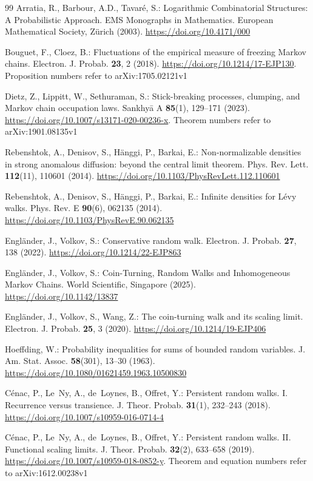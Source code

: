 \documentclass[11pt]{article}
\theoremstyle{definition}
\theoremstyle{remark}
\begin{document}
\begin{thebibliography}{99}
Arratia, R., Barbour, A.D., Tavar\'e, S.: Logarithmic Combinatorial
Structures: A Probabilistic Approach. EMS Monographs in Mathematics. European
Mathematical Society, Z\"urich (2003). \url{https://doi.org/10.4171/000}

Bouguet, F., Cloez, B.: Fluctuations of the empirical measure of freezing
Markov chains. Electron. J. Probab. \textbf{23}, 2 (2018).
\url{https://doi.org/10.1214/17-EJP130}. Proposition numbers refer to
arXiv:1705.02121v1

Dietz, Z., Lippitt, W., Sethuraman, S.: Stick-breaking processes, clumping,
and Markov chain occupation laws. Sankhy\=a A \textbf{85}(1), 129--171
(2023). \url{https://doi.org/10.1007/s13171-020-00236-x}. Theorem numbers
refer to arXiv:1901.08135v1

Rebenshtok, A., Denisov, S., H\"anggi, P., Barkai, E.: Non-normalizable
densities in strong anomalous diffusion: beyond the central limit theorem.
Phys. Rev. Lett. \textbf{112}(11), 110601 (2014).
\url{https://doi.org/10.1103/PhysRevLett.112.110601}

Rebenshtok, A., Denisov, S., H\"anggi, P., Barkai, E.: Infinite densities for
L\'evy walks. Phys. Rev. E \textbf{90}(6), 062135 (2014).
\url{https://doi.org/10.1103/PhysRevE.90.062135}

Engl\"ander, J., Volkov, S.: Conservative random walk. Electron. J. Probab.
\textbf{27}, 138 (2022). \url{https://doi.org/10.1214/22-EJP863}

Engl\"ander, J., Volkov, S.: Coin-Turning, Random Walks and Inhomogeneous
Markov Chains. World Scientific, Singapore (2025).
\url{https://doi.org/10.1142/13837}

Engl\"ander, J., Volkov, S., Wang, Z.: The coin-turning walk and its scaling
limit. Electron. J. Probab. \textbf{25}, 3 (2020).
\url{https://doi.org/10.1214/19-EJP406}

Hoeffding, W.: Probability inequalities for sums of bounded random variables.
J. Am. Stat. Assoc. \textbf{58}(301), 13--30 (1963).
\url{https://doi.org/10.1080/01621459.1963.10500830}

C\'enac, P., Le~Ny, A., de~Loynes, B., Offret, Y.: Persistent random walks.
I. Recurrence versus transience. J. Theor. Probab. \textbf{31}(1), 232--243
(2018). \url{https://doi.org/10.1007/s10959-016-0714-4}

C\'enac, P., Le~Ny, A., de~Loynes, B., Offret, Y.: Persistent random walks.
II. Functional scaling limits. J. Theor. Probab. \textbf{32}(2), 633--658
(2019). \url{https://doi.org/10.1007/s10959-018-0852-y}. Theorem and
equation numbers refer to arXiv:1612.00238v1


\end{thebibliography}
\end{document}
